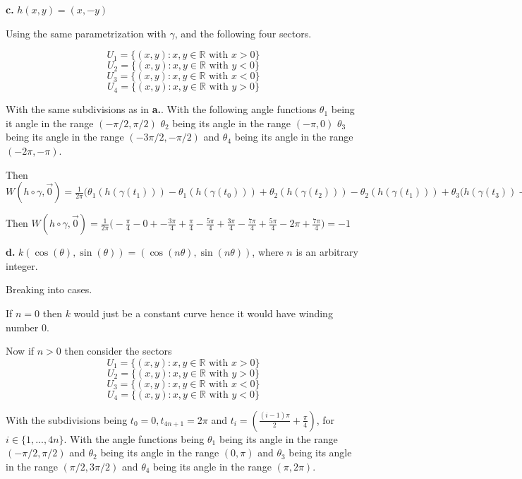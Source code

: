 \documentclass{amsart}
\theoremstyle{plain}
\theoremstyle{definition}
\theoremstyle{remark}
\begin{document}
\vspace{.1in}
{\bfseries c.} $h(x,y) = (x,-y)$


Using the same parametrization with $\gamma$, and the following four sectors. 


$$U_1=\{(x,y): x,y \in \mathbb R \text { with }x>0\}$$
$$U_2=\{(x,y): x,y \in \mathbb R \text { with }y<0\}$$
$$U_3=\{(x,y):x,y\in \mathbb R \text { with } x<0\}$$
$$U_4=\{(x,y):x,y\in \mathbb R \text { with }y>0\}$$

With the same subdivisions as in {\bfseries a.}. With the following angle functions $\theta_1$ being it angle in the range $(-\pi/2,\pi /2)$ $\theta_2$ being its angle in the range $( -\pi,0)$ $\theta_3$ being its angle in the range $(-3\pi/2,-\pi/2)$ and $\theta_4$ being its angle in the range $(-2\pi,-\pi)$. 


Then $W(h\circ \gamma , \vec 0)=\frac{1}{2\pi}\big(\theta_1(h(\gamma(t_1)))-\theta_1(h(\gamma(t_0)))+\theta_2(h(\gamma(t_2)))-\theta_2(h(\gamma(t_1)))+\theta_3(h(\gamma(t_3))-\theta_3(h(\gamma(t_2)))+\theta_4(h(\gamma(t_4)))-\theta_4(h(\gamma(t_3)))+\theta_1(h(\gamma(t_5)))-\theta_1(h(\gamma(t_4))) \big)$

Then $W(h\circ \gamma,\vec 0)=\frac{1}{2\pi}\big( -\frac{\pi}{4} - 0+ -\frac{3\pi}{4}+\frac{\pi}{4}-\frac{5\pi}{4}+\frac{3\pi}{4}-\frac{7\pi}{4}+\frac{5\pi}{4}-2\pi+\frac{7\pi}{4} \big)=-1$


\vspace{.1in}
{\bfseries d.} $k(\cos (\theta ), \sin (\theta )) = (\cos (n\theta ), \sin (n\theta ))$, where $n$ is an arbitrary integer.
{
    Breaking into cases. 

    If $n=0$ then $k$ would just be a constant curve hence it would have winding number $0$.

    Now if $n>0$ then consider the sectors $$U_1=\{(x,y):x,y\in \mathbb R \text{ with } x>0\}$$ $$U_2=\{(x,y):x,y\in \mathbb R \text{ with } y>0\}$$ $$U_3=\{(x,y):x,y\in \mathbb R \text{ with } x<0\}$$ $$U_4=\{(x,y):x,y\in \mathbb R \text{ with } y<0\}$$
    
    With the subdivisions being $t_0=0,t_{4n+1}=2\pi$ and $t_i=(\frac{(i-1)\pi}{2}+\frac{\pi}{4})$, for $i\in \{1,...,4n\}$. With the angle functions being $\theta_1$ being its angle in the range $(-\pi/2,\pi/2)$ and $\theta_2$ being its angle in the range $(0,\pi)$ and $\theta_3$ being its angle in the range $(\pi/2,3\pi/2)$ and $\theta_4$ being its angle in the range $(\pi,2\pi)$. 

    


}
\end{document}
